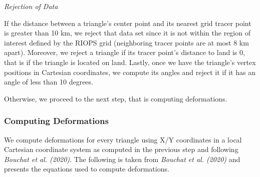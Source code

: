 \documentclass[draft]{agujournal2018}
\begin{document}
\textit{Rejection of Data}

If the distance between a triangle's center point and its nearest grid tracer point is greater than 10 km, we reject that data set since it is not within the region of interest defined by the RIOPS grid (neighboring tracer points are at most 8 km apart). Moreover, we reject a triangle if its tracer point's distance to land is 0, that is if the triangle is located on land. Lastly, once we have the triangle's vertex positions in Cartesian coordinates, we compute its angles and reject it if it has an angle of less than 10 degrees. 

Otherwise, we proceed to the next step, that is computing deformations.



\subsubsection{Computing Deformations}

We compute deformations for every triangle using X/Y coordinates in a local Cartesian coordinate system as computed in the previous step and following \textit{Bouchat et al. (2020)}. The following is taken from \textit{Bouchat et al. (2020)} and presents the equations used to compute deformations.
\end{document}
